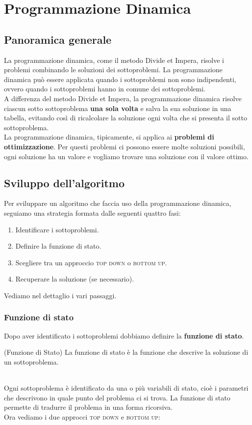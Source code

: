 \chapter{Programmazione Dinamica}
\section{Panoramica generale}
La programmazione dinamica, come il metodo Divide et Impera, risolve i problemi combinando le soluzioni dei sottoproblemi. La programmazione dinamica può essere applicata quando i sottoproblemi non sono indipendenti, ovvero quando i sottoproblemi hanno in comune dei sottoproblemi.\smallskip\\
A differenza del metodo Divide et Impera, la programmazione dinamica risolve ciascun sotto sottoproblema \textbf{una sola volta} e salva la sua soluzione in una tabella, evitando così di ricalcolare la soluzione ogni volta che si presenta il sotto sottoproblema.\smallskip\\
La programmazione dinamica, tipicamente, si applica ai \textbf{problemi di ottimizzazione}. Per questi problemi ci possono essere molte soluzioni possibili, ogni soluzione ha un valore e vogliamo trovare una soluzione con il valore ottimo.

\section{Sviluppo dell'algoritmo}
Per sviluppare un algoritmo che faccia uso della programmazione dinamica, seguiamo una strategia formata dalle seguenti quattro fasi:
\begin{enumerate}
    \item Identificare i sottoproblemi.
    \item Definire la funzione di stato.
    \item Scegliere tra un approccio \textsc{top down} o \textsc{bottom up}.

    \item Recuperare la soluzione (se necessario).
\end{enumerate}
Vediamo nel dettaglio i vari passaggi.

\subsection{Funzione di stato}
Dopo aver identificato i sottoproblemi dobbiamo definire la \textbf{funzione di stato}.\smallskip\\
\colorbox{SALZO}{\parbox{\dimexpr\linewidth-2\fboxsep}{\begin{definition}
    (Funzione di Stato) La funzione di stato è la funzione che descrive la soluzione di un sottoproblema. 
\end{definition}}}\smallskip\\
Ogni sottoproblema è identificato da una o più variabili di stato, cioè i parametri che descrivono in quale punto del problema ci si trova. La funzione di stato permette di tradurre il problema in una forma ricorsiva.\medskip\\
Ora vediamo i due approcci \textsc{top down} e \textsc{bottom up}:\smallskip\\

